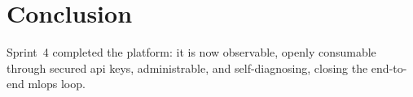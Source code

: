 \section*{Conclusion}
Sprint~4 completed the platform: it is now observable, openly consumable through
secured \gls{api} keys, administrable, and self-diagnosing, closing the end-to-end
\gls{mlops} loop.
